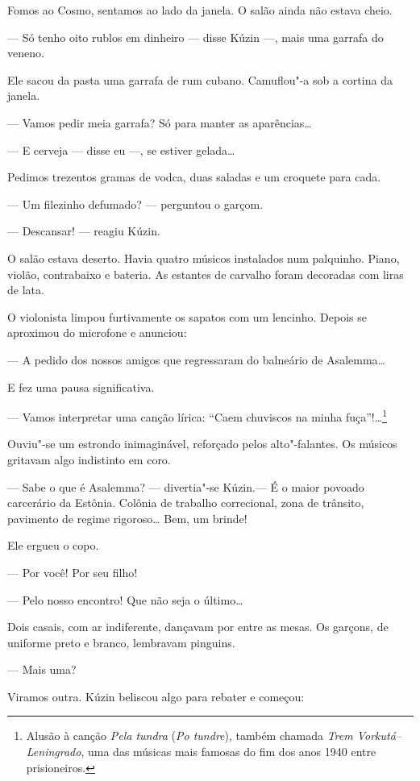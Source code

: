 Fomos ao Cosmo, sentamos ao lado da janela. O salão ainda não estava
cheio.

--- Só tenho oito rublos em dinheiro --- disse Kúzin ---, mais uma
garrafa do veneno.

Ele sacou da pasta uma garrafa de rum cubano. Camuflou"-a sob a cortina
da janela.

--- Vamos pedir meia garrafa? Só para manter as aparências\ldots{}

--- E cerveja --- disse eu ---, se estiver gelada\ldots{}

Pedimos trezentos gramas de vodca, duas saladas e um croquete para cada.

--- Um filezinho defumado? --- perguntou o garçom.

--- Descansar! --- reagiu Kúzin.

O salão estava deserto. Havia quatro músicos instalados num palquinho.
Piano, violão, contrabaixo e bateria. As estantes de carvalho foram
decoradas com liras de lata.

O violonista limpou furtivamente os sapatos com um lencinho. Depois se
aproximou do microfone e anunciou:

--- A pedido dos nossos amigos que regressaram do balneário de
Asalemma\ldots{}

E fez uma pausa significativa.

--- Vamos interpretar uma canção lírica: ``Caem chuviscos na minha
fuça''!\ldots{}\footnote{Alusão à canção \emph{Pela tundra} (\emph{Po
  tundre}), também chamada \emph{Trem Vorkutá--Leningrado}, uma
  das músicas mais famosas do fim dos anos 1940 entre prisioneiros.}

Ouviu"-se um estrondo inimaginável, reforçado pelos alto"-falantes. Os
músicos gritavam algo indistinto em coro.

--- Sabe o que é Asalemma? --- divertia"-se Kúzin.--- É o maior povoado
carcerário da Estônia. Colônia de trabalho correcional, zona de
trânsito, pavimento de regime rigoroso\ldots{} Bem, um brinde!

Ele ergueu o copo.

--- Por você! Por seu filho!

--- Pelo nosso encontro! Que não seja o último\ldots{}

Dois casais, com ar indiferente, dançavam por entre as mesas. Os
garçons, de uniforme preto e branco, lembravam pinguins.

--- Mais uma?

Viramos outra. Kúzin beliscou algo para rebater e começou:

